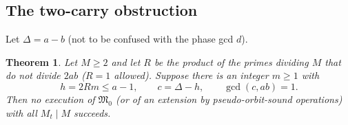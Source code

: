 \documentclass[11pt,reqno]{amsart}
\newtheorem{theorem}{Theorem}
\theoremstyle{definition}
\theoremstyle{remark}
\begin{document}
\subsection{The two-carry obstruction}\label{sec:8.3}

Let \(\Delta=a-b\) (not to be confused with the phase gcd \(d\)).

\begin{samepage}
\begin{theorem}\leavevmode\label{thm:42}
Let \(M\ge2\) and let \(R\) be the product of the primes
dividing \(M\) that do not divide \(2ab\) (\(R=1\) allowed). Suppose
there is an integer \(m\ge1\) with
\[
h=2Rm\le a-1,\qquad c=\Delta-h,\qquad \gcd(c,ab)=1 .
\tag{28}\label{eq:28}
\]
Then no execution of \(\mathfrak M_0\) (or of an extension by
pseudo-orbit-sound operations) with all \(M_t\mid M\) succeeds.
\label{thm-end:42}
\end{theorem}
\end{samepage}
\end{document}
